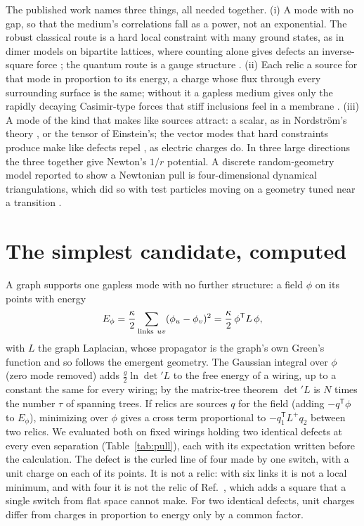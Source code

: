 \documentclass[pre,twocolumn,superscriptaddress,nofootinbib]{revtex4-2}
\begin{document}
The published work names three things, all needed together. (i) A mode with no gap, so that the medium's correlations
fall as a power, not an exponential. The robust classical route is a hard local constraint with many ground states, as
in dimer models on bipartite lattices, where counting alone gives defects an inverse-square force \cite{HKMS03,Henley};
the quantum route is a gauge structure \cite{GW09}. (ii) Each relic a source for that mode in proportion to its energy,
a charge whose flux through every surrounding surface is the same; without it a gapless medium gives only the
rapidly decaying Casimir-type forces that stiff inclusions feel in a membrane \cite{GBP93,KG99}. (iii) A mode of the kind that makes like sources
attract: a scalar, as in Nordstr\"om's theory \cite{Giulini}, or the tensor of Einstein's; the vector modes that hard
constraints produce make like defects repel \cite{Henley}, as electric charges do. In three large directions the three
together give Newton's $1/r$ potential. A discrete random-geometry model reported to show a Newtonian pull is
four-dimensional dynamical triangulations, which did so with test particles moving on a geometry tuned near a transition \cite{dBS97,DLSU21}.

\section{The simplest candidate, computed}

A graph supports one gapless mode with no further structure: a field $\phi$ on its points with energy
\begin{equation}
E_\phi = \frac{\kappa}{2}\sum_{{\rm links}\ uv}(\phi_u - \phi_v)^2 = \frac{\kappa}{2}\,\phi^{\mathsf T}L\,\phi ,
\label{eq:field}
\end{equation}
with $L$ the graph Laplacian, whose propagator is the graph's own Green's function and so follows the emergent
geometry. The Gaussian integral over $\phi$ (zero mode removed) adds $\frac{g}{2}\ln\det{}'L$ to the free energy of a
wiring, up to a constant the same for every wiring; by the matrix-tree theorem $\det{}'L$ is $N$ times the number
$\tau$ of spanning trees. If relics are sources $q$ for the field (adding $-q^{\mathsf T}\phi$ to $E_\phi$), minimizing
over $\phi$ gives a cross term proportional to $-q_1^{\mathsf T}L^{+}q_2$ between two relics. We evaluated both on fixed
wirings holding two identical defects at every even separation (Table~\ref{tab:pull}), each with its expectation
written before the calculation. The defect is the curled line of four made by one switch, with a unit charge on each
of its points. It is not a relic: with six links it is not a local minimum, and with four it is not the relic of
Ref.~\cite{paper2}, which adds a square that a single switch from flat space cannot make. For two identical defects,
unit charges differ from charges in proportion to energy only by a common factor.
\end{document}
